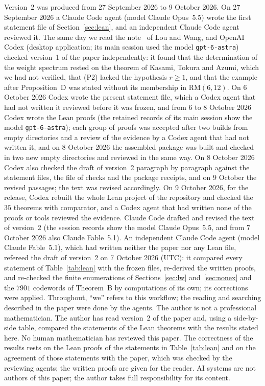 \documentclass[11pt]{article}
\theoremstyle{remark}
\newcommand{\RM}{\mathrm{RM}}
\begin{document}
Version~2 was produced from 27 September 2026 to 9 October 2026. On
27 September 2026 a Claude Code agent (model Claude Opus~5.5) wrote the first
statement file of Section~\ref{sec:lean}, and an independent Claude Code agent
reviewed it. The same day we read the note~\cite{lw2} of Lou and Wang, and
OpenAI Codex (desktop application; its main session used the model
\texttt{gpt-6-astra}) checked version~1 of the paper independently: it found that the determination of the
weight spectrum rested on the theorem of Kasami, Tokura and Azumi, which we
had not verified, that (P2) lacked the hypothesis $r\ge1$, and that the
example after Proposition~D was stated without its membership in
$\RM(6,12)$. On 6 October 2026 Codex wrote the present statement file, which
a Codex agent that had not written it reviewed before it was frozen, and from
6 to 8 October 2026 Codex wrote the Lean proofs (the retained records of its
main session show the model \texttt{gpt-6-astra}); each group of proofs was accepted
after two builds from empty directories and a review of the evidence by a
Codex agent that had not written it, and on 8 October 2026 the assembled
package was built and checked in two new empty directories and reviewed in
the same way. On 8 October 2026 Codex also checked the draft of version~2
paragraph by paragraph against the statement files, the file of checks and
the package receipts, and on 9 October the revised passages; the text was
revised accordingly. On 9 October 2026, for the release, Codex rebuilt the
whole Lean project of the repository and checked the $35$ theorems with
comparator, and a Codex agent that had written none of the proofs or tools
reviewed the evidence. Claude Code drafted and revised the text of version~2 (the
session records show the model Claude Opus~5.5, and from 7 October 2026 also
Claude Fable~5.1). An independent Claude Code agent (model Claude
Fable~5.1), which had written neither the paper nor any Lean file, refereed
the draft of version~2 on 7 October 2026 (UTC): it compared every statement of
Table~\ref{tab:lean} with the frozen files, re-derived the written proofs,
and re-checked the finite enumerations of Sections~\ref{sec:lw}
and~\ref{sec:nonex} and the $7901$ codewords of Theorem~B by computations of
its own; its corrections were applied. Throughout, ``we'' refers to this workflow; the
reading and searching described in the paper were done by the agents. The
author is not a professional mathematician.
The author has read version~2 of the paper and, using a side-by-side table,
compared the statements of the Lean theorems with the results stated here.
No human mathematician has reviewed this paper. The correctness of the results
rests on the Lean proofs of the statements in Table~\ref{tab:lean} and on the
agreement of those statements with the paper, which was checked by the
reviewing agents; the written proofs are given for the reader. AI systems are
not authors of this paper; the author takes full responsibility for its
content.
\end{document}
